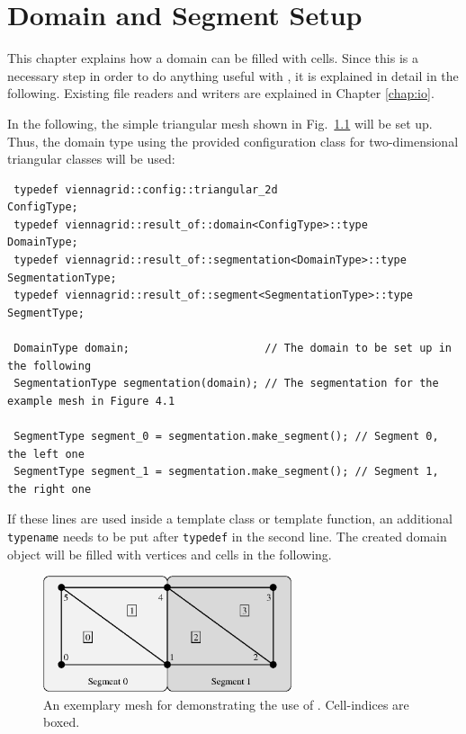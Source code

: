 \chapter{Domain and Segment Setup} \label{chap:domainsetup}

This chapter explains how a {\ViennaGrid} domain can be filled with cells. Since this
is a necessary step in order to do anything useful with {\ViennaGrid}, it is explained in detail in the following.
Existing file readers and writers are explained in Chapter \ref{chap:io}.


In the following, the simple triangular mesh shown in Fig.~\ref{fig:sampledomain} will be set up.
Thus, the domain type using the provided configuration class for two-dimensional triangular classes will be used:
\begin{lstlisting}
 typedef viennagrid::config::triangular_2d                        ConfigType;
 typedef viennagrid::result_of::domain<ConfigType>::type          DomainType;
 typedef viennagrid::result_of::segmentation<DomainType>::type    SegmentationType;
 typedef viennagrid::result_of::segment<SegmentationType>::type   SegmentType;

 DomainType domain;                     // The domain to be set up in the following
 SegmentationType segmentation(domain); // The segmentation for the example mesh in Figure 4.1
 
 SegmentType segment_0 = segmentation.make_segment(); // Segment 0, the left one
 SegmentType segment_1 = segmentation.make_segment(); // Segment 1, the right one
\end{lstlisting}
If these lines are used inside a template class or template function, an additional \lstinline|typename| needs to be put after \lstinline|typedef| in the second line.
The created domain object will be filled with vertices and cells in the following.

\begin{figure}[tb]
\centering
 \includegraphics[width=0.65\textwidth]{figures/sampledomain.eps}
 \caption{An exemplary mesh for demonstrating the use of {\ViennaGrid}. Cell-indices are boxed.}
 \label{fig:sampledomain}
\end{figure}


